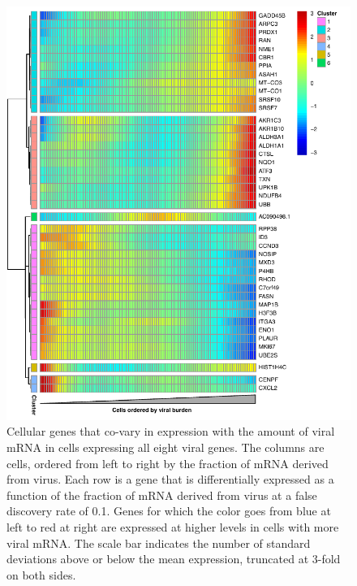 \documentclass[9pt,lineno]{elife}
\begin{document}
\begin{figure}[t!]
\centerline{\includegraphics[width=0.63\linewidth]{figures/p_cellular_heatmap_manualedits.pdf}}
\caption{\label{fig:cellulargenes}
Cellular genes that co-vary in expression with the amount of viral mRNA in cells expressing all eight viral genes.
The columns are cells, ordered from left to right by the fraction of mRNA derived from virus.
Each row is a gene that is differentially expressed as a function of the fraction of mRNA derived from virus at a false discovery rate of 0.1. 
Genes for which the color goes from blue at left to red at right are expressed at higher levels in cells with more viral mRNA.
The scale bar indicates the number of standard deviations above or below the mean expression, truncated at 3-fold on both sides. 
}





\end{figure}
\end{document}
